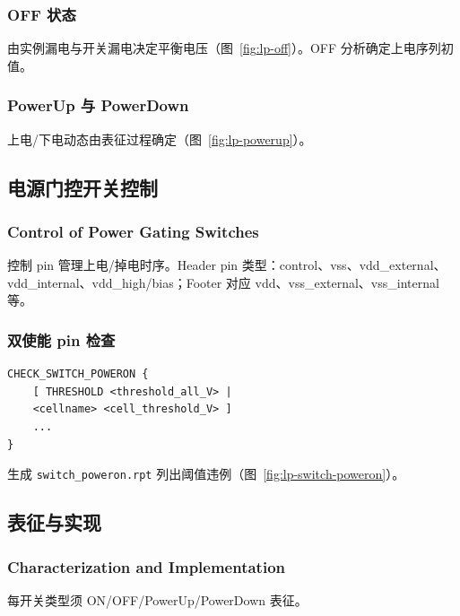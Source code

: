 \subsubsection{OFF 状态}
由实例漏电与开关漏电决定平衡电压（图~\ref{fig:lp-off}）。OFF 分析确定上电序列初值。



\subsubsection{PowerUp 与 PowerDown}
上电/下电动态由表征过程确定（图~\ref{fig:lp-powerup}）。


\subsection{电源门控开关控制}
\subsubsection*{Control of Power Gating Switches}

控制 pin 管理上电/掉电时序。Header pin 类型：control、vss、vdd\_external、vdd\_internal、vdd\_high/bias；Footer 对应 vdd、vss\_external、vss\_internal 等。

\subsubsection{双使能 pin 检查}
\begin{lstlisting}
CHECK_SWITCH_POWERON {
    [ THRESHOLD <threshold_all_V> |
    <cellname> <cell_threshold_V> ]
    ...
}
\end{lstlisting}
生成 \texttt{switch\_poweron.rpt} 列出阈值违例（图~\ref{fig:lp-switch-poweron}）。


\subsection{表征与实现}
\subsubsection*{Characterization and Implementation}

每开关类型须 ON/OFF/PowerUp/PowerDown 表征。

